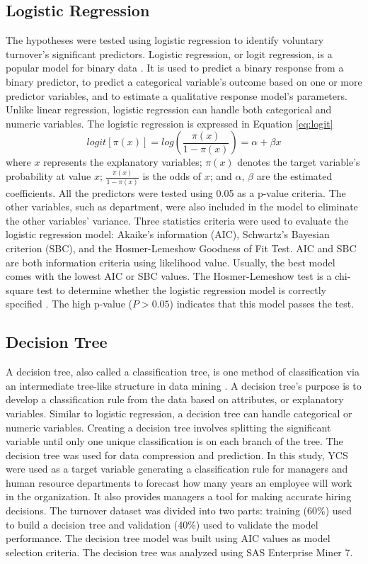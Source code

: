 \subsection{Logistic Regression}
The hypotheses were tested using logistic regression to identify voluntary turnover's significant predictors. Logistic regression, or logit regression, is a popular model for binary data \citep{RN57}. It is used to predict a binary response from a binary predictor, to predict a categorical variable's outcome based on one or more predictor variables, and to estimate a qualitative response model's parameters. Unlike linear regression, logistic regression can handle both categorical and numeric variables. The logistic regression is expressed in Equation \ref{eq:logit}
\begin{equation}
logit[\pi(x)]=log(\frac{\pi(x)} {1-\pi(x)})= \alpha+\beta x  
\label{eq:logit}            
\end{equation}
where $x$ represents the explanatory variables; $\pi(x)$ denotes the target variable's probability at value $x$; $\frac{\pi(x)} {1-\pi(x)}$ is the odds of $x$; and $\alpha$, $\beta$ are the estimated coefficients. All the predictors were tested using 0.05 as a p-value criteria. The other variables, such as department, were also included in the model to eliminate the other variables' variance. Three statistics criteria were used to evaluate the logistic regression model: Akaike's information (AIC), Schwartz's Bayesian criterion (SBC), and the Hosmer-Lemeshow Goodness of Fit Test. AIC and SBC are both information criteria using likelihood value. Usually, the best model comes with the lowest AIC or SBC values. The Hosmer-Lemeshow test is a chi-square test to determine whether the logistic regression model is correctly specified \citep{hosmer2004}. The high p-value ($P>0.05$) indicates that this model passes the test. 
\subsection{Decision Tree}
A decision tree, also called a classification tree, is one method of classification via an intermediate tree-like structure in data mining \citep{hand2001}. A decision tree's purpose is to develop a classification rule from the data based on attributes, or explanatory variables. Similar to logistic regression, a decision tree can handle categorical or numeric variables. Creating a decision tree involves splitting the significant variable until only one unique classification is on each branch of the tree. The decision tree was used for data compression and prediction. 
In this study, YCS were used as a target variable generating a classification rule for managers and human resource departments to forecast how many years an employee will work in the organization. It also provides managers a tool for making accurate hiring decisions. The turnover dataset was divided into two parts: training (60\%) used to build a decision tree and validation (40\%) used to validate the model performance. The decision tree model was built using AIC values as model selection criteria. The decision tree was analyzed using SAS Enterprise Miner 7. 
